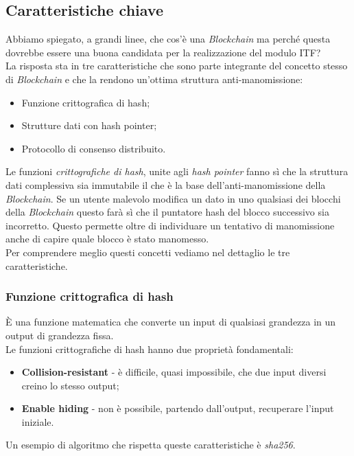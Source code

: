 \subsection{Caratteristiche chiave}
Abbiamo spiegato, a grandi linee, che cos'è una \textit{Blockchain} ma perché questa dovrebbe essere una buona candidata per la realizzazione del modulo \gls{ITF}?\\
La risposta sta in tre caratteristiche che sono parte integrante del concetto stesso di \textit{Blockchain} e che la rendono un'ottima struttura anti-manomissione:
\begin{itemize}
	\item Funzione crittografica di hash;
	\item Strutture dati con hash pointer;
	\item Protocollo di consenso distribuito.
\end{itemize}
Le funzioni \textit{crittografiche di hash}, unite agli \textit{hash pointer} fanno sì che la struttura dati complessiva sia immutabile il che è la base dell'anti-manomissione della \textit{Blockchain}.
Se un utente malevolo modifica un dato in uno qualsiasi dei blocchi della \textit{Blockchain} questo farà sì che il puntatore hash del blocco successivo sia incorretto. Questo permette oltre di individuare un tentativo di manomissione anche di capire quale blocco è stato manomesso.\\
Per comprendere meglio questi concetti vediamo nel dettaglio le tre caratteristiche.
\subsubsection{Funzione crittografica di hash}
È una funzione matematica che converte un input di qualsiasi grandezza in un output di grandezza fissa.\\
Le funzioni crittografiche di hash hanno due proprietà fondamentali:
\begin{itemize}
	\item \textbf{Collision-resistant} - è difficile, quasi impossibile, che due input diversi creino lo stesso output;
	\item \textbf{Enable hiding} - non è possibile, partendo dall'output, recuperare l'input iniziale.
\end{itemize}
Un esempio di algoritmo che rispetta queste caratteristiche è \emph{\gls{sha256}}\glsfirstoccur.

